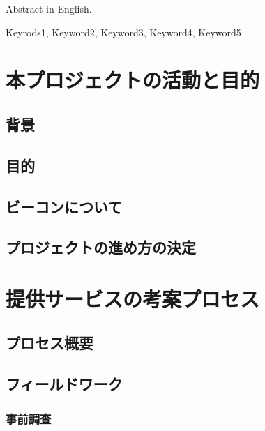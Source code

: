 \documentclass[openany,11pt,papersize]{jsbook}
\begin{document}
\begin{eabstract} Abstract in English. 
\begin{ekeyword}
Keyrods1, Keyword2, Keyword3, Keyword4, Keyword5
\end{ekeyword}
\end{eabstract}

\tableofcontents%


\mainmatter%

\chapter{本プロジェクトの活動と目的}

\section{背景}


\section{目的}


\section{ビーコンについて}


\section{プロジェクトの進め方の決定}



\chapter{提供サービスの考案プロセス}

\section{プロセス概要}


\section{フィールドワーク}

\subsection{事前調査}
\end{document}
